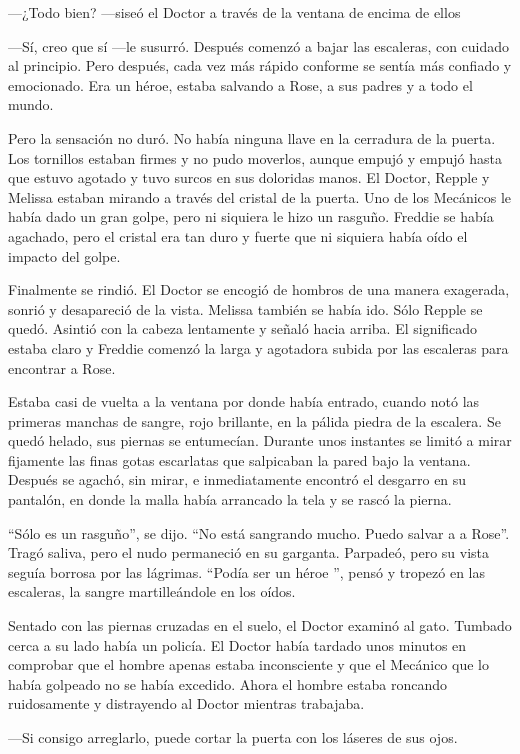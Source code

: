 {---¿Todo bien? ---siseó el Doctor a través de la ventana de encima de
ellos}

{---Sí, creo que sí ---le susurró. Después comenzó a bajar las
	escaleras, con cuidado al principio. Pero después, cada vez más
	rápido conforme se sentía más confiado y emocionado. Era un héroe,
estaba salvando a Rose, a sus padres y a todo el mundo.}

{Pero la sensación no duró. No había ninguna llave en la cerradura
	de la puerta. Los tornillos estaban firmes y no pudo moverlos,
	aunque empujó y empujó hasta que estuvo agotado y tuvo surcos en sus
	doloridas manos. El Doctor, Repple y Melissa estaban mirando a
	través del cristal de la puerta. Uno de los Mecánicos le había dado
	un gran golpe, pero ni siquiera le hizo un rasguño. Freddie se había
	agachado, pero el cristal era tan duro y fuerte que ni siquiera había
oído el impacto del golpe.}

{Finalmente se rindió. El Doctor se encogió de hombros de una manera
	exagerada, sonrió y desapareció de la vista. Melissa también se
	había ido. Sólo Repple se quedó. Asintió con la cabeza lentamente y
	señaló hacia arriba. El significado estaba claro y Freddie comenzó
la larga y agotadora subida por las escaleras para encontrar a Rose.}

{Estaba casi de vuelta a la ventana por donde había entrado, cuando notó
	las primeras manchas de sangre, rojo brillante, en la pálida piedra de
	la escalera. Se quedó helado, sus piernas se entumecían. Durante
	unos instantes se limitó a mirar fijamente las finas gotas escarlatas
	que salpicaban la pared bajo la ventana. Después se agachó, sin
	mirar, e inmediatamente encontró el desgarro en su pantalón, en donde la
malla había arrancado la tela y se rascó la pierna.}

{``Sólo es un rasguño'', se dijo. ``No está sangrando
	mucho. Puedo salvar a a Rose''. Tragó saliva, pero el nudo permaneció
	en su garganta. Parpadeó, pero su vista seguía borrosa por las
	lágrimas. ``Podía ser un héroe '', pensó y tropezó en las escaleras,
la sangre martilleándole en los oídos.}

{Sentado con las piernas cruzadas en el suelo, el Doctor examinó al
	gato. Tumbado cerca a su lado había un policía. El Doctor había
	tardado unos minutos en comprobar que el hombre apenas estaba
	inconsciente y que el Mecánico que lo había golpeado no se había
	excedido. Ahora el hombre estaba roncando ruidosamente y distrayendo
al Doctor mientras trabajaba.}

{---Si consigo arreglarlo, puede cortar la puerta con los láseres de sus
ojos.}

